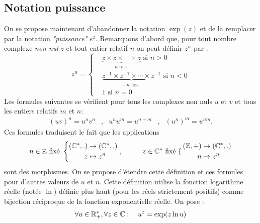 \subsection{Notation puissance}
On se propose maintenant d'abandonner la notation $\exp (z)$ et de la remplacer par la notation \emph{"puissance"} $e^z$.\newline
Remarquons d'abord que, pour tout nombre complexe \emph{non nul} $z$ et tout entier relatif $n$ on peut définir $z^n$ par :
\begin{displaymath}
z^n =
 \begin{cases}
  &\underset{n \text{ fois }}{\underbrace{z\times z \times \cdots \times z}} \text{ si } n> 0  \\
  &\underset{-n \text{ fois }}{\underbrace{z^{-1}\times z^{-1} \times \cdots \times z^{-1}}} \text{ si } n< 0\\
  &1 \text{ si } n=0
 \end{cases}
\end{displaymath}
Les formules suivantes se vérifient pour tous les complexes non nuls $u$ et $v$ et tous les entiers relatifs $m$ et $n$:
\begin{align*}
 (uv)^n = u^n v^n &,& u^n u^m = u^{n+m} &,& (u^n)^m = u^{nm}.
\end{align*}
Ces formules traduisent le fait que les applications
\begin{displaymath}
n\in \mathbb{Z} \text{ fixé }
 \left\lbrace 
 \begin{aligned}
  (\mathbb{C}^*,.) &\rightarrow (\mathbb{C}^*,.) \\ z &\mapsto z^n
 \end{aligned}
 \left. ,\hspace{1cm}
z\in \mathbb{C}^* \text{ fixé }
 \right\lbrace 
 \begin{aligned}
  (\mathbb{Z},+) &\rightarrow (\mathbb{C}^*,.) \\ n &\mapsto z^n
 \end{aligned}
 \right. 
\end{displaymath}
sont des morphismes.\newline
On se propose d'étendre cette définition et ces formules pour d'autres valeurs de $u$ et $n$. Cette définition utilise la fonction logarithme réelle (notée $\ln$) définie plus haut (pour les réels strictement positifs)  comme bijection réciproque de la fonction exponentielle réelle.\newline
On pose :
\begin{align*}
 \forall u \in \mathbb{R}_+^* , \forall z \in \mathbb{C} : \quad u^z = \exp(z\ln u)
\end{align*}
